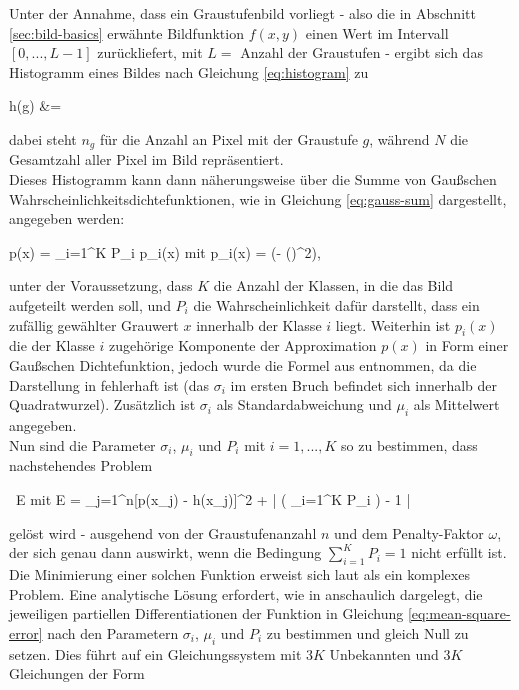 			Unter der Annahme, dass ein Graustufenbild vorliegt - also die in Abschnitt \ref{sec:bild-basics} erwähnte Bildfunktion $f(x,y)$ einen Wert im Intervall $[0, ..., L-1]$ zurückliefert, mit $L = $ Anzahl der Graustufen - ergibt sich das Histogramm eines Bildes nach Gleichung \ref{eq:histogram} zu
			\begin{flalign}
				\centering
				h(g) &=  \label{eq:histogram}
			\end{flalign}
			dabei steht $n_{g}$ für die Anzahl an Pixel mit der Graustufe $g$, während $N$ die Gesamtzahl aller Pixel im Bild repräsentiert.\\
			Dieses Histogramm kann dann näherungsweise über die Summe von Gaußschen Wahrscheinlichkeitsdichtefunktionen, wie in Gleichung \ref{eq:gauss-sum} dargestellt, angegeben werden:
			\begin{flalign}
				\centering
				p(x) = \sum_{i=1}^{K} P_{i} \cdot p_{i}(x) \quad \textrm{mit} \quad p_{i}(x) =  \exp\left(- \cdot \left(\right)^{2}\right), \label{eq:gauss-sum}
			\end{flalign}
			unter der Voraussetzung, dass $K$ die Anzahl der Klassen, in die das Bild aufgeteilt werden soll, und $P_{i}$ die Wahrscheinlichkeit dafür darstellt, dass ein zufällig gewählter Grauwert $x$ innerhalb der Klasse $i$ liegt. Weiterhin ist $p_{i}(x)$ die der Klasse $i$ zugehörige Komponente der Approximation $p(x)$ in Form einer Gaußschen Dichtefunktion, jedoch wurde die Formel aus \cite{papula-gauss} entnommen, da die Darstellung in \cite{cuevas-meth1} fehlerhaft ist (das $\sigma_{i}$ im ersten Bruch befindet sich innerhalb der Quadratwurzel). Zusätzlich ist $\sigma_{i}$ als Standardabweichung und $\mu_{i}$ als Mittelwert angegeben.\\
			Nun sind die Parameter $\sigma_{i}$, $\mu_{i}$ und $P_{i}$ mit $i = 1, ..., K$ so zu bestimmen, dass nachstehendes Problem
			\begin{flalign}
				\centering
				 \ E \quad \textrm{mit } E =  \sum_{j=1}^{n}[p(x_{j}) - h(x_{j})]^{2} + \omega \cdot \left| \left( \sum_{i=1}^{K} P_{i} \right) - 1 \right| \label{eq:mean-square-error}
			\end{flalign}
			gelöst wird - ausgehend von der Graustufenanzahl $n$ und dem Penalty-Faktor $\omega$, der sich genau dann auswirkt, wenn die Bedingung $\sum_{i=1}^{K} P_{i} = 1$ nicht erfüllt ist.\\
			Die Minimierung einer solchen Funktion erweist sich laut \cite{cuevas-meth1} als ein komplexes Problem. Eine analytische Lösung erfordert, wie in \cite[S. 248-250]{papula-optimization} anschaulich dargelegt, die jeweiligen partiellen Differentiationen der Funktion in Gleichung \ref{eq:mean-square-error} nach den Parametern $\sigma_{i}$, $\mu_{i}$ und $P_{i}$ zu bestimmen und gleich Null zu setzen. Dies führt auf ein Gleichungssystem mit $3K$ Unbekannten und $3K$ Gleichungen der Form
